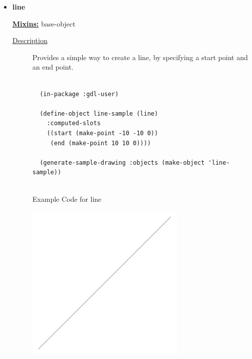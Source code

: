 \documentclass [11pt]{book}
\begin{document}
\begin{itemize}
\item {}
\label{prim:line}
\textbf{line}


\textbf{
\underline{Mixins:}} base-object





\begin{description}

\item [
\underline{Description}]


Provides a simple way to create a line, 
by specifying a start point and an end point.



\end{description}




\begin{figure}
\begin{lrbox}{\boxedverb}
\begin{minipage}{\linewidth}
{\small

\begin{verbatim}

  (in-package :gdl-user)  
  
  (define-object line-sample (line)
    :computed-slots
    ((start (make-point -10 -10 0))
     (end (make-point 10 10 0))))

  (generate-sample-drawing :objects (make-object 'line-sample))
  

\end{verbatim}}
\end{minipage}
\end{lrbox}
\fbox{\usebox{\boxedverb}}

\caption{Example Code for line}

\label{fig:example-code-line}

\end{figure}

\begin{figure}
\begin{center}
\includegraphics[width=3in,height=3in]{../images/example-line.pdf}
\end{center}


\end{figure}
\end{itemize}
\end{document}
